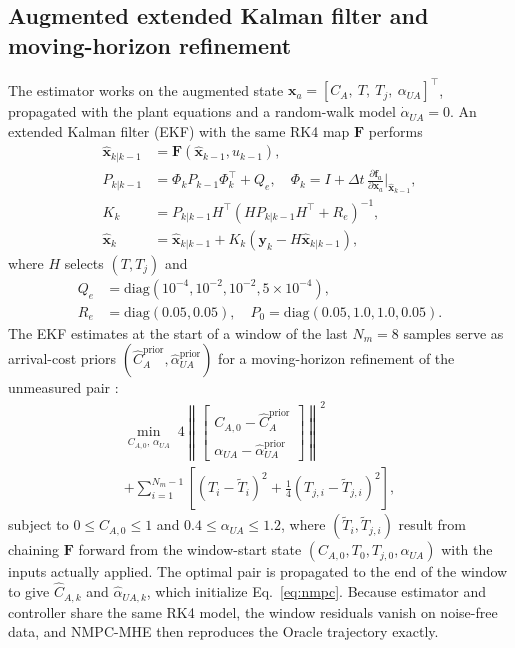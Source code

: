 \subsection{Augmented extended Kalman filter and moving-horizon refinement}
\label{subsec:mhe}
The estimator works on the augmented state $\mathbf{x}_a = [C_A,\ T,\ T_j,\ \alpha_{UA}]^\top$, propagated with the plant equations and a random-walk model $\dot\alpha_{UA} = 0$. An extended Kalman filter (EKF) with the same RK4 map $\mathbf{F}$ performs
\begin{align}
    \hat{\mathbf{x}}_{k|k-1} &= \mathbf{F}(\hat{\mathbf{x}}_{k-1}, u_{k-1}), \nonumber \\
    P_{k|k-1} &= \Phi_k P_{k-1} \Phi_k^\top + Q_e, \quad \Phi_k = I + \Delta t\,\frac{\partial \mathbf{f}_a}{\partial \mathbf{x}_a}\Big|_{\hat{\mathbf{x}}_{k-1}}, \nonumber \\
    K_k &= P_{k|k-1} H^\top \left(H P_{k|k-1} H^\top + R_e\right)^{-1}, \nonumber \\
    \hat{\mathbf{x}}_k &= \hat{\mathbf{x}}_{k|k-1} + K_k\left(\mathbf{y}_k - H\hat{\mathbf{x}}_{k|k-1}\right), \label{eq:ekf}
\end{align}
where $H$ selects $(T, T_j)$ and
\begin{align}
    Q_e &= \mathrm{diag}(10^{-4}, 10^{-2}, 10^{-2}, 5\times10^{-4}), \nonumber \\
    R_e &= \mathrm{diag}(0.05, 0.05), \quad P_0 = \mathrm{diag}(0.05, 1.0, 1.0, 0.05). \nonumber
\end{align}
The EKF estimates at the start of a window of the last $N_m = 8$ samples serve as arrival-cost priors $(\hat C_A^{\text{prior}}, \hat\alpha_{UA}^{\text{prior}})$ for a moving-horizon refinement of the unmeasured pair \cite{rao2003constrained}:
\begin{multline}
    \min_{C_{A,0},\,\alpha_{UA}} \; 4\left\|\begin{bmatrix} C_{A,0} - \hat C_{A}^{\text{prior}} \\ \alpha_{UA} - \hat\alpha_{UA}^{\text{prior}}\end{bmatrix}\right\|^2 \\
    + \sum_{i=1}^{N_m - 1} \left[\left(T_i - \tilde T_i\right)^2 + \tfrac14\left(T_{j,i} - \tilde T_{j,i}\right)^2\right],
    \label{eq:mhe}
\end{multline}
subject to $0 \le C_{A,0} \le 1$ and $0.4 \le \alpha_{UA} \le 1.2$, where $(\tilde T_i, \tilde T_{j,i})$ result from chaining $\mathbf{F}$ forward from the window-start state $(C_{A,0}, T_0, T_{j,0}, \alpha_{UA})$ with the inputs actually applied. The optimal pair is propagated to the end of the window to give $\hat C_{A,k}$ and $\hat\alpha_{UA,k}$, which initialize Eq.~\eqref{eq:nmpc}. Because estimator and controller share the same RK4 model, the window residuals vanish on noise-free data, and NMPC-MHE then reproduces the Oracle trajectory exactly.

